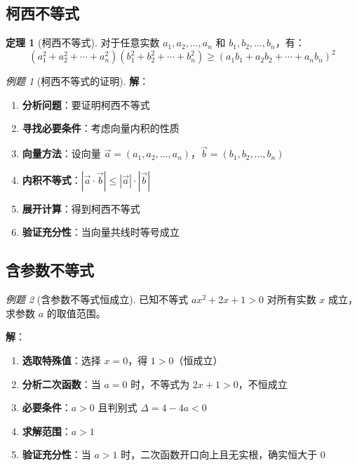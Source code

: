 \documentclass[a4paper,11pt]{ctexart}
\newcommand{\keypoint}[1]{\textcolor{secondary}{\textbf{#1}}}
\theoremstyle{definition}
\newtheorem{theorem}{定理}[section]
\theoremstyle{remark}
\newtheorem{example}{例题}[section]
\begin{document}
\subsection{柯西不等式}

\begin{theorem}[柯西不等式]
对于任意实数 $a_1, a_2, \ldots, a_n$ 和 $b_1, b_2, \ldots, b_n$，有：
$$(a_1^2 + a_2^2 + \cdots + a_n^2)(b_1^2 + b_2^2 + \cdots + b_n^2) \geq (a_1b_1 + a_2b_2 + \cdots + a_nb_n)^2$$
\end{theorem}

\begin{example}[柯西不等式的证明]
\textbf{解}：
\begin{enumerate}
    \item \keypoint{分析问题}：要证明柯西不等式
    \item \keypoint{寻找必要条件}：考虑向量内积的性质
    \item \keypoint{向量方法}：设向量 $\vec{a} = (a_1, a_2, \ldots, a_n)$，$\vec{b} = (b_1, b_2, \ldots, b_n)$
    \item \keypoint{内积不等式}：$|\vec{a} \cdot \vec{b}| \leq |\vec{a}| \cdot |\vec{b}|$
    \item \keypoint{展开计算}：得到柯西不等式
    \item \keypoint{验证充分性}：当向量共线时等号成立
\end{enumerate}
\end{example}

\subsection{含参数不等式}

\begin{example}[含参数不等式恒成立]
已知不等式 $ax^2 + 2x + 1 > 0$ 对所有实数 $x$ 成立，求参数 $a$ 的取值范围。

\textbf{解}：
\begin{enumerate}
    \item \keypoint{选取特殊值}：选择 $x = 0$，得 $1 > 0$（恒成立）
    \item \keypoint{分析二次函数}：当 $a = 0$ 时，不等式为 $2x + 1 > 0$，不恒成立
    \item \keypoint{必要条件}：$a > 0$ 且判别式 $\Delta = 4 - 4a < 0$
    \item \keypoint{求解范围}：$a > 1$
    \item \keypoint{验证充分性}：当 $a > 1$ 时，二次函数开口向上且无实根，确实恒大于 $0$
\end{enumerate}
\end{example}
\end{document}
